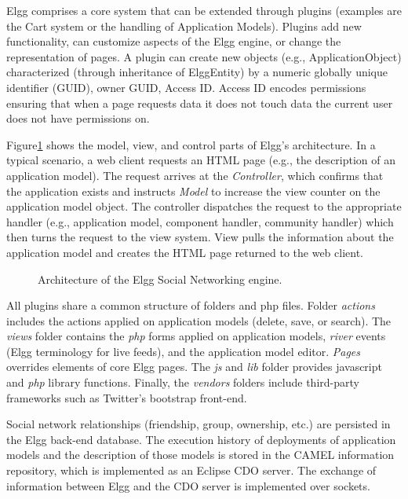Elgg comprises a core system that can be extended through plugins (examples are the Cart system or the handling of Application Models). Plugins add new functionality, can customize aspects of the Elgg engine, or change the representation of pages.
A plugin can create new objects (e.g., ApplicationObject) characterized (through inheritance of ElggEntity) by a numeric globally unique identifier (GUID), owner GUID, Access ID. Access ID encodes permissions ensuring that when a page requests data it does not touch data the current user does not have permissions on. 

Figure\ref{fig:elgg_architecture} shows the model, view, and control parts of Elgg's architecture. In a typical scenario, a web client requests an HTML page (e.g., the description of an application model).  The request arrives at the \emph{Controller}, which confirms that the application exists and instructs \emph{Model} to increase the view counter on the application model object. The controller dispatches the request to the appropriate handler (e.g., application model, component handler, community handler) which then turns the request to the view system. View pulls the information about the application model and creates the HTML page returned to the web client.

\begin{figure}[h]
	\caption{Architecture of the Elgg Social Networking engine.}
	\centering
	\label{fig:elgg_architecture}
\end{figure}


All plugins share a common structure of folders and php files. Folder {\em actions} includes the actions applied on application models (delete, save, or search). The {\em views} folder contains the {\em php} forms applied on application models, {\em river} events (Elgg terminology for live feeds), and the application model editor. {\em Pages} overrides elements of core Elgg pages.  The {\em js} and {\em lib} folder provides javascript and {\em php} library functions. Finally, the {\em vendors} folders include third-party frameworks such as Twitter's bootstrap front-end.

Social network relationships (friendship, group, ownership, etc.) are persisted in the Elgg back-end database. The execution history of deployments of application models and the description of those models is stored in the CAMEL information repository, which is implemented as an Eclipse CDO server. The exchange of information between Elgg and the CDO server is implemented over sockets.

